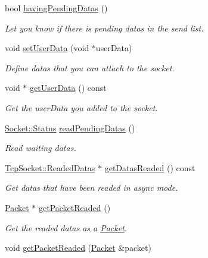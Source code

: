 \begin{DoxyCompactItemize}
bool \hyperlink{classmognetwork_1_1_tcp_socket_a7269551095b10d859f8710cb5aaed3d6}{having\-Pending\-Datas} ()
\begin{DoxyCompactList}\small\item\em Let you know if there is pending datas in the send list. \end{DoxyCompactList}\item 
void \hyperlink{classmognetwork_1_1_tcp_socket_a2d7327be349e705c74bdc6b40c1b2520}{set\-User\-Data} (void $\ast$user\-Data)
\begin{DoxyCompactList}\small\item\em Define datas that you can attach to the socket. \end{DoxyCompactList}\item 
void $\ast$ \hyperlink{classmognetwork_1_1_tcp_socket_adef63a929423324fd75888e2195176e0}{get\-User\-Data} () const 
\begin{DoxyCompactList}\small\item\em Get the user\-Data you added to the socket. \end{DoxyCompactList}\item 
\hyperlink{classmognetwork_1_1_socket_aa187a8394ac0d6203af0ec7f021ca15f}{Socket\-::\-Status} \hyperlink{classmognetwork_1_1_tcp_socket_af3918374ee41223b77f669367d4b0e22}{read\-Pending\-Datas} ()
\begin{DoxyCompactList}\small\item\em Read waiting datas. \end{DoxyCompactList}\item 
\hyperlink{structmognetwork_1_1_tcp_socket_1_1_readed_datas}{Tcp\-Socket\-::\-Readed\-Datas} $\ast$ \hyperlink{classmognetwork_1_1_tcp_socket_a6dbe149a276fb24203267762fbd1c276}{get\-Datas\-Readed} () const 
\begin{DoxyCompactList}\small\item\em Get datas that have been readed in async mode. \end{DoxyCompactList}\item 
\hyperlink{classmognetwork_1_1_packet}{Packet} $\ast$ \hyperlink{classmognetwork_1_1_tcp_socket_ac8619a5f869abfda7b8c2d32c94870f3}{get\-Packet\-Readed} ()
\begin{DoxyCompactList}\small\item\em Get the readed datas as a \hyperlink{classmognetwork_1_1_packet}{Packet}. \end{DoxyCompactList}\item 
void \hyperlink{classmognetwork_1_1_tcp_socket_a59b3b86a8698b3df3a51243d113907a0}{get\-Packet\-Readed} (\hyperlink{classmognetwork_1_1_packet}{Packet} \&packet)

\end{DoxyCompactItemize}
